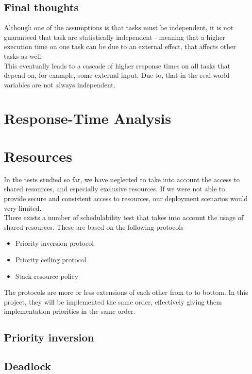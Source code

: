 \documentclass{acm_proc_article-sp}
\begin{document}
\subsection{Final thoughts}
Although one of the assumptions is that tasks must be independent, it is not guaranteed that task are statistically independent - meaning that a higher execution time on one task can be due to an external effect, that affects other tasks as well.\\
This eventually leads to a cascade of higher response times on all tasks that depend on, for example, some external input. Due to, that in the real world variables are not always independent.

\section{Response-Time Analysis}
\label{sec:rta}



\section{Resources}
In the tests studied so far, we have neglected to take into account the access to shared resources, and especially exclusive resources. If we were not able to provide secure and consistent access to resources, our deployment scenarios would very limited.\\
There exists a number of schedulability test that takes into account the usage of shared resources. These are based on the following protocols
\begin{itemize}
\item Priority inversion protocol
\item Priority ceiling protocol
\item Stack resource policy
\end{itemize}
The protocols are more or less extensions of each other from to to bottom. In this project, they will be implemented the same order, effectively giving them implementation priorities in the same order.

\subsection{Priority inversion}

\subsection{Deadlock}
\end{document}
